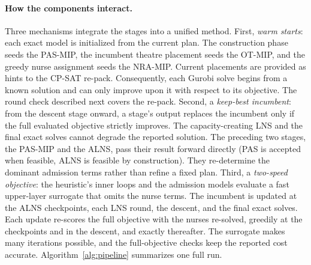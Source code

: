 \documentclass[11pt]{article}
\begin{document}
	\paragraph{How the components interact.}
	Three mechanisms integrate the stages into a unified method. First, \emph{warm starts}: each exact model is initialized from the current plan. The construction phase seeds the PAS-MIP, the incumbent theatre placement seeds the OT-MIP, and the greedy nurse assignment seeds the NRA-MIP. Current placements are provided as hints to the CP-SAT re-pack. Consequently, each Gurobi solve begins from a known solution  and can only improve upon it with respect to its objective. The round check described next covers the re-pack. Second, a \emph{keep-best incumbent}: from the descent stage onward, a stage's output replaces the incumbent only if the full evaluated objective strictly improves. The capacity-creating LNS and the final exact solves cannot degrade the reported solution. The preceding two stages, the PAS-MIP and the ALNS, pass their result forward directly (PAS is accepted when feasible, ALNS is feasible by construction). They re-determine the dominant admission terms rather than refine a fixed plan. Third, a \emph{two-speed objective}: the heuristic's inner loops and the admission models evaluate a fast upper-layer surrogate that omits the nurse terms. The incumbent is updated at the ALNS checkpoints, each LNS round, the descent, and the final exact solves. Each update re-scores the full objective with the nurses re-solved, greedily at the checkpoints and in the descent, and exactly thereafter. The surrogate makes many iterations possible, and the full-objective checks keep the reported cost
	accurate. Algorithm~\ref{alg:pipeline} summarizes one full run.
\end{document}
